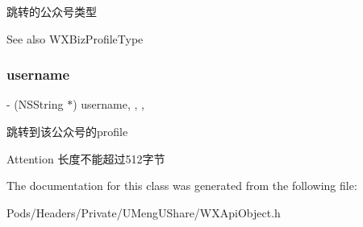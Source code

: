 跳转的公众号类型 \begin{DoxySeeAlso}{See also}
W\+X\+Biz\+Profile\+Type 
\end{DoxySeeAlso}
\mbox{\label{interface_jump_to_biz_profile_req_ad217e5e684d4db4977260fc8df38003b}} 
\subsubsection{\texorpdfstring{username}{username}}
{\footnotesize\ttfamily -\/ (N\+S\+String $\ast$) username\hspace{0.3cm}{\ttfamily [read]}, {\ttfamily [write]}, {\ttfamily [nonatomic]}, {\ttfamily [retain]}}

跳转到该公众号的profile \begin{DoxyAttention}{Attention}
长度不能超过512字节 
\end{DoxyAttention}


The documentation for this class was generated from the following file\+:\begin{DoxyCompactItemize}
\item 
Pods/\+Headers/\+Private/\+U\+Meng\+U\+Share/W\+X\+Api\+Object.\+h\end{DoxyCompactItemize}
